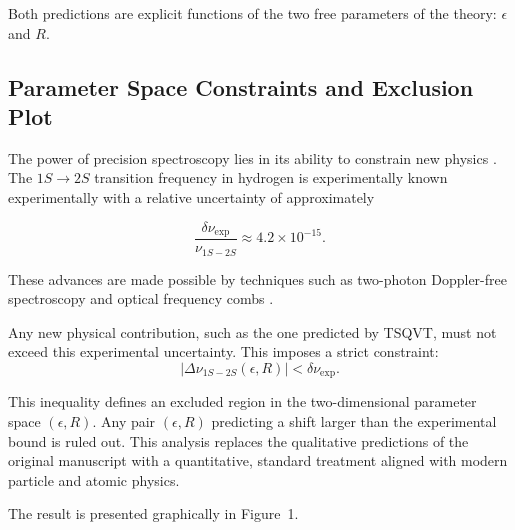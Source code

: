 \documentclass[a4paper]{article}
\begin{document}
Both predictions are explicit functions of the two free parameters of the theory: $\epsilon$ and $R$.

\subsection{Parameter Space Constraints and Exclusion Plot}

The power of precision spectroscopy lies in its ability to constrain new physics \cite{Stadnik2020}. The $1S \to 2S$ transition frequency in hydrogen is experimentally known experimentally with a relative uncertainty of approximately \cite{Beyer2017}


\begin{equation}
\frac{\delta \nu_{\text{exp}}}{\nu_{1S-2S}} \approx 4.2 \times 10^{-15}.
\end{equation}

These advances are made possible by techniques such as two-photon Doppler-free spectroscopy and optical frequency combs \cite{Beyer2017, HanschOnline}.

Any new physical contribution, such as the one predicted by TSQVT, must not exceed this experimental uncertainty. This imposes a strict constraint:
\begin{equation}
	|\Delta \nu_{1S-2S}(\epsilon, R)| < \delta \nu_{\text{exp}}.
\end{equation}

This inequality defines an excluded region in the two-dimensional parameter space $(\epsilon, R)$. Any pair $(\epsilon, R)$ predicting a shift larger than the experimental bound is ruled out. This analysis replaces the qualitative predictions of the original manuscript with a quantitative, standard treatment aligned with modern particle and atomic physics.

The result is presented graphically in Figure~1.
\end{document}
